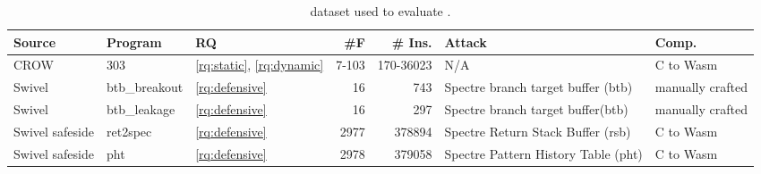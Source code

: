 
\begin{table}
\renewcommand\arraystretch{1.1}
\begin{adjustbox}{width=\linewidth,totalheight=\textheight, keepaspectratio}
    \begin{tabular}{p{1.2cm} | l | l | r | r | p{2cm} | p{1cm} }
        \hline
        Source & Program & RQ & \#F & \# Ins. & Attack & Comp. \\
        \hline \hline
        CROW & 303 & \ref{rq:static}, \ref{rq:dynamic} & 7-103 & 170-36023 & N/A & C to Wasm \\
        \hline
        Swivel & btb\_breakout & \ref{rq:defensive} & 16 & 743 & Spectre branch target buffer (btb) & manually crafted \\
        \hline
        Swivel & btb\_leakage & \ref{rq:defensive} & 16 & 297 & Spectre branch target buffer(btb) & manually crafted \\
        \hline
        Swivel safeside & ret2spec & \ref{rq:defensive} & 2977 & 378894 & Spectre Return Stack Buffer (rsb) & C to Wasm \\
        \hline
        Swivel safeside & pht & \ref{rq:defensive} & 2978 & 379058 & Spectre Pattern History Table (pht) & C to Wasm \\

    \end{tabular}
\end{adjustbox}
    
    \caption{\wasm dataset used to evaluate \tool.}
    \label{tab:corpus}
\end{table}

